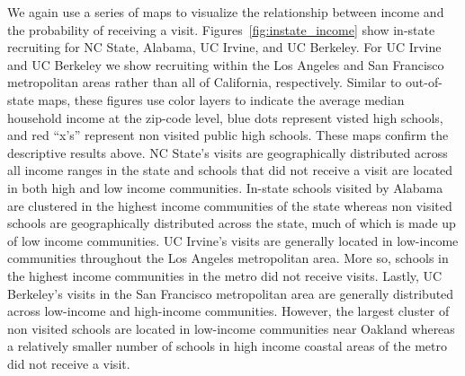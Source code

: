 \documentclass[twoside]{article}
\begin{document}




We again use a series of maps to visualize the relationship between income and the probability of receiving a visit. Figures~\ref{fig:instate_income} show in-state recruiting for NC State, Alabama, UC Irvine, and UC Berkeley. For UC Irvine and UC Berkeley we show recruiting within the Los Angeles and San Francisco metropolitan areas rather than all of California, respectively. Similar to out-of-state maps, these figures use color layers to indicate the average median household income at the zip-code level, blue dots represent visted high schools, and red ``x's'' represent non visited public high schools. These maps confirm the descriptive results above. NC State's visits are geographically distributed across all income ranges in the state and schools that did not receive a visit are located in both high and low income communities. In-state schools visited by Alabama are clustered in the highest income communities of the state whereas non visited schools are geographically distributed across the state, much of which is made up of low income communities. UC Irvine's visits are generally located in low-income communities throughout the Los Angeles metropolitan area. More so, schools in the highest income communities in the metro did not receive visits. Lastly, UC Berkeley's visits in the San Francisco metropolitan area are generally distributed across low-income and high-income communities. However, the largest cluster of non visited schools are located in low-income communities near Oakland whereas a relatively smaller number of schools in high income coastal areas of the metro did not receive a visit.
\end{document}
